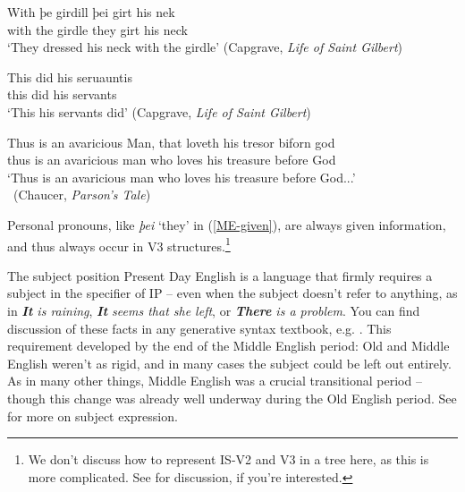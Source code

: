 \begin{exe}
\ex
\gll With þe girdill þei girt his nek\\
with the girdle they girt his neck\\
\trans `They dressed his neck with the girdle' \hfill (Capgrave, \emph{Life of Saint Gilbert})
\label{ME-given}
\end{exe}

\begin{exe}
\ex
\gll This did his seruauntis\\
this did his servants\\
\trans `This his servants did' \hfill (Capgrave, \emph{Life of Saint Gilbert})
\label{ME-new}
\end{exe}

\begin{exe}
\ex
\gll Thus is an avaricious Man, that loveth his tresor biforn god\\
thus is an avaricious man who loves his treasure before God\\
\trans `Thus is an avaricious man who loves his treasure before God...'\\~\hfill (Chaucer, \emph{Parson's Tale})
\label{ME-new2}
\end{exe}


\noindent Personal pronouns, like \emph{þei} `they' in (\ref{ME-given}), are always given information, and thus always occur in V3 structures.\footnote{We don't discuss how to represent IS-V2 and V3 in a tree here, as this is more complicated. See \citet[Chapter 7]{Los2015} for discussion, if you're interested.}


\begin{syntaxbox}{The subject position}
Present Day English is a language that firmly requires a subject in the specifier of IP -- even when the subject doesn't refer to anything, as in \emph{\textbf{It} is raining}, \emph{\textbf{It} seems that she left}, or \emph{\textbf{There} is a problem}. You can find discussion of these facts in any generative syntax textbook, e.g. \citet[Chapter 8]{Carnie2013}. This requirement developed by the end of the Middle English period: Old and Middle English weren't as rigid, and in many cases the subject could be left out entirely. As in many other things, Middle English was a crucial transitional period -- though this change was already well underway during the Old English period. See  for more on subject expression.
\end{syntaxbox}



